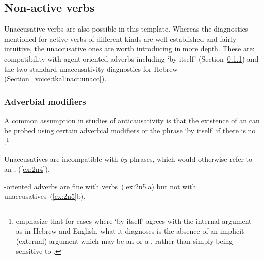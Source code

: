 \begin{exe}
\begin{xlist}
\begin{exe}
\begin{xlist}
\begin{exe}
\begin{xlist}
	
 \z
\z 

	\subsection{Non-active verbs} \label{voice:tkal:nact}
Unaccusative verbs are also possible in this template. Whereas the diagnostics mentioned for active verbs of different kinds are well-established and fairly intuitive, the unaccusative ones are worth introducing in more depth. These are: compatibility with agent-oriented adverbs including `by itself’ (Section~\ref{voice:tkal:nact:adv}) and the two standard unaccusativity diagnostics for Hebrew (Section~\ref{voice:tkal:nact:unacc}).

		\subsubsection{Adverbial modifiers} \label{voice:tkal:nact:adv}
A common assumption in studies of anticausativity is that the existence of an  can be probed using certain adverbial modifiers or the phrase `by itself' if there is no  \citep{unaccusativity95,alexiadouanagnostopoulou04,layering15,alexiadoudoron12,koontzgarboden09,kastner17gjgl}.\footnote{\cite{layering15} emphasize that for cases where `by itself' agrees with the internal argument as in Hebrew and English, what it diagnoses is the absence of an implicit (external) argument which may be an  or a , rather than simply being sensitive to .} 

Unaccusatives are incompatible with \emph{by}-phrases, which would otherwise refer to an , (\ref{ex:2n4}).
 \begin{exe}
 \label{ex:2n4}
	
 \z 

-oriented adverbs are fine with  verbs~(\ref{ex:2n5}a) but not with unaccusatives~(\ref{ex:2n5}b).
 \begin{exe}
 \ex  \label{ex:2n5}
 \begin{xlist} 
		

\end{xlist}
\end{exe}
\end{exe}
\end{xlist}
\end{exe}
\end{xlist}
\end{exe}
\end{xlist}
\end{exe}
